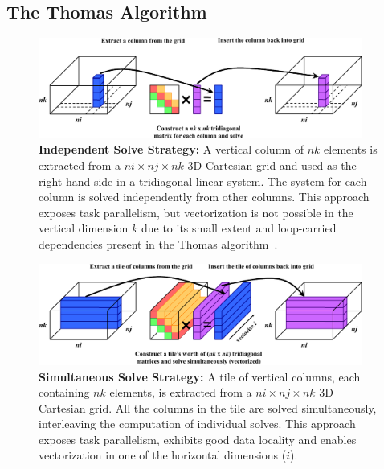 \documentclass[10pt, conference, compsocconf]{IEEEtran}
\begin{document}
\subsection{The Thomas Algorithm}
\label{sec:impl:thomas_algorithm}

\begin{figure}[!bth]
  \centering
  \caption{
    \textbf{Independent Solve Strategy:} A vertical column of \(nk\) elements is
      extracted from a \(ni \times nj \times nk\) 3D Cartesian grid and used as
      the right-hand side in a tridiagonal linear system.
    The system for each column is solved independently from other columns.
    This approach exposes task parallelism, but vectorization is not possible
      in the vertical dimension \(k\) due to its small extent and loop-carried
      dependencies present in the Thomas algorithm~\cite{pipelined_thomas_algorithm}.
  }
  \label{fig:impl:batching:ind_strat}
  \includegraphics[width=0.95\textwidth]{figures/batching/independent_solve_diagram.pdf}
\end{figure}

\begin{figure}[!bth]
  \centering
  \caption{
    \textbf{Simultaneous Solve Strategy:} A tile of vertical columns, each 
      containing \(nk\) elements, is extracted from a \(ni \times nj \times nk\)
      3D Cartesian grid.
    All the columns in the tile are solved simultaneously, interleaving 
      the computation of individual solves.
    This approach exposes task parallelism, exhibits good data locality and
      enables vectorization in one of the horizontal dimensions (\(i\)).
  }
  \label{fig:impl:batching:sim_strat}
  \includegraphics[width=0.95\textwidth]{figures/batching/simultaneous_solve_diagram.pdf}
\end{figure}
\end{document}
